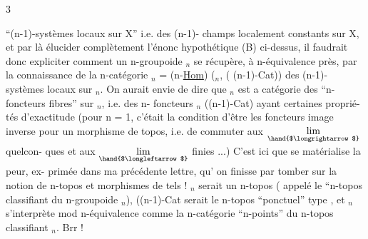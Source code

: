  \hfill 3

``(n-1)-systèmes locaux sur X'' i.e. des (n-1)- champs localement constants
sur X, et par là élucider complètement l'énonc hypothétique (B) ci-dessus,
il faudrait donc expliciter comment un n-groupoide $_n$ se récupère, à
n-équivalence près, par la connaissance de la n-catégorie
$_n$ = (n-\underline{Hom}) ($_n$, ( (n-1)-Cat)) des (n-1)- systèmes locaux sur $_n$. On
aurait envie de dire que $_n$ est a catégorie des ``n-foncteurs fibres'' sur
$_n$, i.e. des n- foncteurs $_n$ \hand{$\longrightarrow$}((n-1)-Cat) ayant certaines proprié-%
tés d'exactitude (pour n = 1, c'était la condition d'être les foncteurs
image inverse pour un morphisme de topos, i.e. de commuter aux $\underset{\hand{$\longrightarrow$}}{\mathrm{lim}}$ quelcon-%
ques et aux $\underset{\hand{$\longleftarrow$}}{\mathrm{lim}}$ finies ...) C'est ici que se matérialise la peur, ex-%
primée dans ma précédente lettre, qu' on finisse par tomber sur la notion
de n-topos et morphismes de tels ! $_n$ serait un n-topos\hand{,} ( appelé
le ``n-topos classifiant du n-groupoide $_n$), ((n-1)-Cat serait le
n-topos ``ponctuel'' type , et $_n$ s'interprète mod n-équivalence
comme la n-catégorie  ``n-points'' du n-topos classifiant $_n$. Brr !

